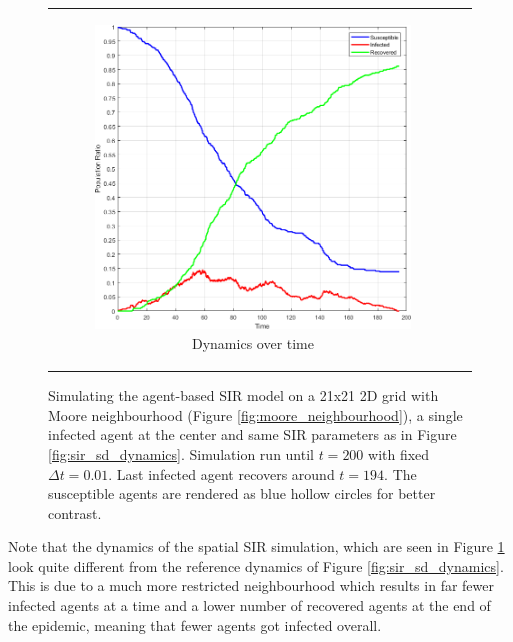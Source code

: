 \begin{figure}
\begin{center}
\begin{tabular}{c c}
		\begin{subfigure}[b]{0.43\textwidth}
			\centering
			\includegraphics[width=1\textwidth, angle=0]{./fig/timedriven/SIR_Dunai/SIR_Dunai_dt001.png}
			\caption{Dynamics over time}
			\label{fig:sir_dunai_env_dynamics}
		\end{subfigure}
	\end{tabular}
	
	\caption{Simulating the agent-based SIR model on a 21x21 2D grid with Moore neighbourhood (Figure \ref{fig:moore_neighbourhood}), a single infected agent at the center and same SIR parameters as in Figure \ref{fig:sir_sd_dynamics}. Simulation run until $t = 200$ with fixed $\Delta t = 0.01$. Last infected agent recovers around $t = 194$. The susceptible agents are rendered as blue hollow circles for better contrast.}
	\label{fig:sir_dunai}
\end{center}
\end{figure}

Note that the dynamics of the spatial SIR simulation, which are seen in Figure \ref{fig:sir_dunai_env_dynamics} look quite different from the reference dynamics of Figure \ref{fig:sir_sd_dynamics}. This is due to a much more restricted neighbourhood which results in far fewer infected agents at a time and a lower number of recovered agents at the end of the epidemic, meaning that fewer agents got infected overall.

